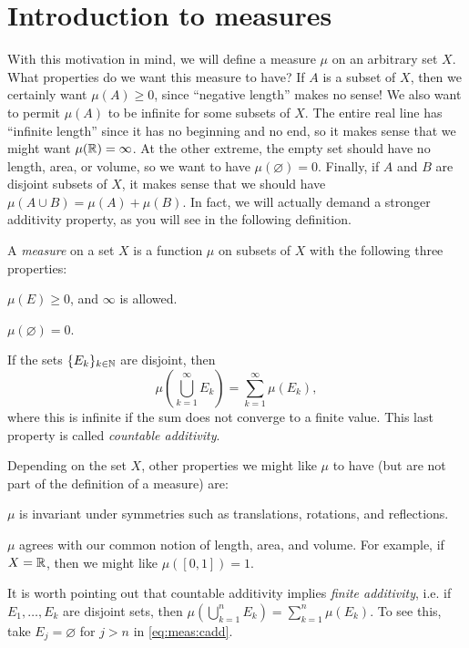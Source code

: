 \documentclass[main.tex]{subfiles}
\begin{document}
\section{Introduction to measures}

With this motivation in mind, we will define a measure $\mu$ on an arbitrary set $X$. What properties do we want this measure to have? If $A$ is a subset of $X$, then we certainly want $\mu(A) \geq 0$, since ``negative length'' makes no sense! We also want to permit $\mu(A)$ to be infinite for some subsets of $X$. The entire real line has ``infinite length'' since it has no beginning and no end, so it makes sense that we might want $\mu({\mathbb R}) = \infty$. At the other extreme, the empty set should have no length, area, or volume, so we want to have $\mu(\varnothing) = 0$. Finally, if $A$ and $B$ are disjoint subsets of $X$, it makes sense that we should have $\mu(A\cup B) = \mu(A) + \mu(B)$. In fact, we will actually demand a stronger additivity property, as you will see in the following definition.

\begin{definition}\label{def:measure}
A \emph{measure} on a set $X$ is a function $\mu$ on subsets of $X$ with the following three properties:
\begin{romannum}
\item $\mu(E) \geq 0$, and $\infty$ is allowed.
\item $\mu(\varnothing) = 0$.
\item If the sets $\{E_k\}_{k \in {\mathbb N}}$ are disjoint, then 
	\begin{equation}\label{eq:meas:cadd}
	\mu \left( \bigcup_{k=1}^\infty E_k \right) = \sum_{k=1}^\infty \mu(E_k),
	\end{equation}
	where this is infinite if the sum does not converge to a finite value. This last property is called \emph{countable additivity}.
\end{romannum}
\end{definition}
Depending on the set $X$, other properties we might like $\mu$ to have (but are not part of the definition of a measure) are:
\begin{romannum}
\setcounter{rmnum}{3}
\item $\mu$ is invariant under symmetries such as translations, rotations, and reflections.
\item $\mu$ agrees with our common notion of length, area, and volume. For example, if $X = {\mathbb R}$, then we might like $\mu([0,1]) = 1$.
\end{romannum}
It is worth pointing out that countable additivity implies \emph{finite additivity}, i.e. if $E_1, \dots, E_k$ are disjoint sets, then $\mu \left( \bigcup_{k=1}^n E_k \right) = \sum_{k=1}^n \mu(E_k)$. To see this, take $E_j = \varnothing$ for $j > n$ in \cref{eq:meas:cadd}.
\end{document}
